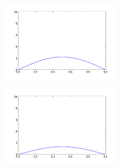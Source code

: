 \documentclass[12pt,fleqn]{article}\usepackage{../../common}
\begin{document}
\includegraphics[height=4cm]{heat-2-60.png}

\includegraphics[height=4cm]{heat-2-80.png}
\end{document}
